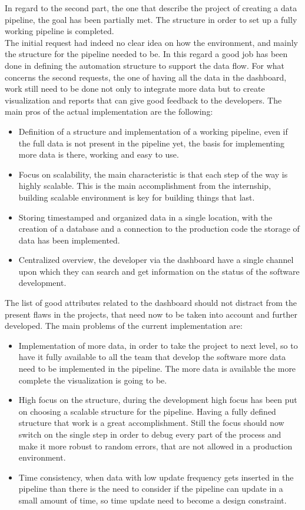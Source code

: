 \documentclass[../main.tex]{subfiles}
\begin{document}
In regard to the second part, the one that describe the project of creating a data pipeline, the goal has been partially met. The structure in order to set up a fully working pipeline is completed.\\
The initial request had indeed no clear idea on how the environment, and mainly the structure for the pipeline needed to be. In this regard a good job has been done in defining the automation structure to support the data flow. For what concerns the second requests, the one of having all the data in the dashboard, work still need to be done not only to integrate more data but to create visualization and reports that can give good feedback to the developers.
The main pros of the actual implementation are the following:
\begin{itemize}
    \item Definition of a structure and implementation of a working pipeline, even if the full data is not present in the pipeline yet, the basis for implementing more data is there, working and easy to use. 
    \item Focus on scalability, the main characteristic is that each step of the way is highly scalable. This is the main accomplishment from the internship, building scalable environment is key for building things that last.
    \item Storing timestamped and organized data in a single location, with the creation of a database and a connection to the production code the storage of data has been implemented. 
    \item Centralized overview, the developer via the dashboard have a single channel upon which they can search and get information on the status of the software development. 
\end{itemize}
The list of good attributes related to the dashboard should not distract from the present flaws in the projects, that need now to be taken into account and further developed. The main problems of the current implementation are:
\begin{itemize}
    \item Implementation of more data, in order to take the project to next level, so to have it fully available to all the team that develop the software more data need to be implemented in the pipeline. The more data is available the more complete the visualization is going to be.
    \item High focus on the structure, during the development high focus has been put on choosing a scalable structure for the pipeline. Having a fully defined structure that work is a great accomplishment. Still the focus should now switch on the single step in order to debug every part of the process and make it more robust to random errors, that are not allowed in a production environment.
    \item Time consistency, when data with low update frequency gets inserted in the pipeline than there is the need to consider if the pipeline can update in a small amount of time, so time update need to become a design constraint. 
\end{itemize}
\end{document}
